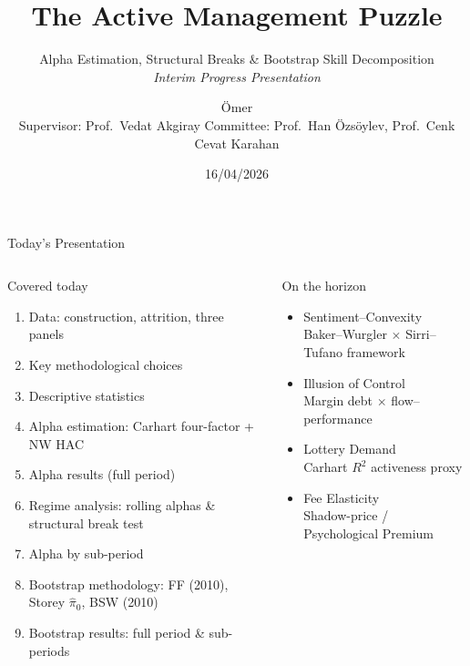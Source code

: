 \documentclass[aspectratio=169,10pt]{beamer}
\title[Active Management Puzzle]{The Active Management Puzzle}
\subtitle{Alpha Estimation, Structural Breaks \& Bootstrap Skill Decomposition\\
\smallskip\normalsize\textit{Interim Progress Presentation}}
\author[Ömer]{Ömer\\[4pt]
{\footnotesize Supervisor: Prof.\ Vedat Akgiray \quad
\newline
Committee: Prof.\ Han Özsöylev, Prof.\ Cenk Cevat Karahan}}
\institute[Boğaziçi University]{Department of Management\\Boğaziçi University}
\date{16/04/2026}
\begin{document}
\begin{frame}[plain]
  \titlepage
\end{frame}

\begin{frame}{Today's Presentation}
\begin{columns}[T]
\begin{block}{Covered today}
\begin{enumerate}
  \item Data: construction, attrition, three panels
  \item Key methodological choices
  \item Descriptive statistics
  \item Alpha estimation: Carhart four-factor + NW HAC
  \item Alpha results (full period)
  \item Regime analysis: rolling alphas \& structural break test
  \item Alpha by sub-period
  \item Bootstrap methodology: FF (2010), Storey $\hat{\pi}_0$, BSW (2010)
  \item Bootstrap results: full period \& sub-periods
\end{enumerate}
\end{block}

\begin{block}{On the horizon}
\begin{itemize}
  \item[\textbf{H1}] Sentiment–Convexity \\
        {\footnotesize Baker–Wurgler $\times$ Sirri–Tufano framework}
  \item[\textbf{H2}] Illusion of Control \\
        {\footnotesize Margin debt $\times$ flow–performance}
  \item[\textbf{H3}] Lottery Demand \\
        {\footnotesize Carhart $R^2$ activeness proxy}
  \item[\textbf{H4}] Fee Elasticity \\
        {\footnotesize Shadow-price / Psychological Premium}
\end{itemize}
\end{block}
\end{columns}
\end{frame}
\end{document}
